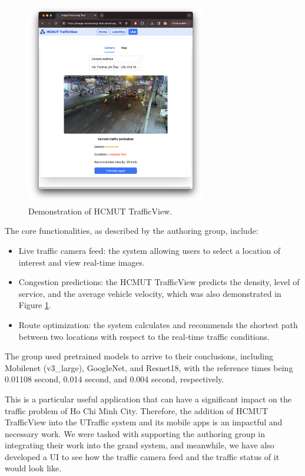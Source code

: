 \begin{figure}[H]
    \centering
    \includegraphics[width=0.7\textwidth]{assets/images/Research/trafficview/hcmut_trafficview_demo.png}
    \caption{Demonstration of HCMUT TrafficView.}
    \label{fig:trafficview_demo}
\end{figure}

The core functionalities, as described by the authoring group, include:
\begin{itemize}
    \item Live traffic camera feed: the system allowing users to select a location of interest and view real-time images.
    \item Congestion predictions: the HCMUT TrafficView predicts the density, level of service, and the average vehicle velocity, which was also demonstrated in Figure \ref{fig:trafficview_demo}.
    \item Route optimization: the system calculates and recommends the shortest path between two locations with respect to the real-time traffic conditions.
\end{itemize}

The group used pretrained models to arrive to their conclusions, including Mobilenet (v3\_large), GoogleNet, and Resnet18, with the reference times being 0.01108 second, 0.014 second, and 0.004 second, respectively.

This is a particular useful application that can have a significant impact on the traffic problem of Ho Chi Minh City. Therefore, the addition of HCMUT TrafficView into the UTraffic system and its mobile apps is an impactful and necessary work. We were tasked with supporting the authoring group in integrating their work into the grand system, and meanwhile, we have also developed a UI to see how the traffic camera feed and the traffic status of it would look like. 

